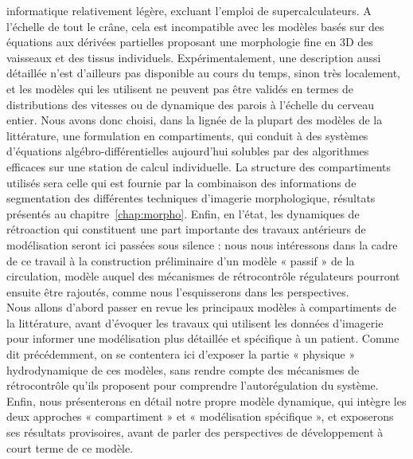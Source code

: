 informatique relativement légère, excluant l'emploi de supercalculateurs. A l'échelle de tout le crâne,
cela est incompatible avec les modèles basés sur des équations aux dérivées partielles proposant une
morphologie fine en 3D des vaisseaux et des tissus individuels. Expérimentalement, une description
aussi détaillée n'est d'ailleurs pas disponible au cours du temps, sinon très localement, et les modèles
qui les utilisent ne peuvent pas être validés en termes de distributions des vitesses ou de dynamique
des parois à l'échelle du cerveau entier. Nous avons donc choisi, dans la lignée de la plupart des
modèles de la littérature, une formulation en compartiments, qui conduit à des systèmes d'équations
algébro-différentielles aujourd'hui solubles par des algorithmes efficaces sur une station de calcul
individuelle. La structure des compartiments utilisés sera celle qui est fournie par la combinaison des
informations de segmentation des différentes techniques d'imagerie morphologique, résultats
présentés au chapitre~\ref{chap:morpho}. Enfin, en l'état, les dynamiques de rétroaction qui constituent une part
importante des travaux antérieurs de modélisation seront ici passées sous silence : nous nous
intéressons dans la cadre de ce travail à la construction préliminaire d'un modèle « passif » de la
circulation, modèle auquel des mécanismes de rétrocontrôle régulateurs pourront ensuite être
rajoutés, comme nous l'esquisserons dans les perspectives.\\
Nous allons d'abord passer en revue les principaux modèles à compartiments de la littérature,
avant d'évoquer les travaux qui utilisent les données d'imagerie pour informer une modélisation plus
détaillée et spécifique à un patient. Comme dit précédemment, on se contentera ici d'exposer la partie
« physique » hydrodynamique de ces modèles, sans rendre compte des mécanismes de rétrocontrôle
qu'ils proposent pour comprendre l'autorégulation du système. Enfin, nous présenterons en détail notre propre modèle dynamique, qui intègre les deux approches « compartiment » et « modélisation
spécifique », et exposerons ses résultats provisoires, avant de parler des perspectives de
développement à court terme de ce modèle.
